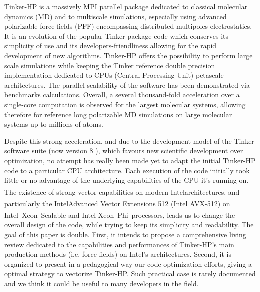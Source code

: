 \documentclass[9pt,comparison]{livecoms}
\newcommand{\rr}{\textsuperscript{\textregistered}}
\newcommand{\tm}{\textsuperscript{\texttrademark}}
\begin{document}
\hspace{\parindent}Tinker-HP is a massively MPI parallel package dedicated to classical molecular dynamics (MD) and to multiscale simulations, especially using advanced polarizable force fields (PFF) encompassing distributed multipoles electrostatics\cite{Tinker-HP}.
It is an evolution of the popular Tinker package code \cite{Tinker8} which conserves its simplicity of use and its developers-friendliness allowing for the rapid development of new algorithms. Tinker-HP offers the possibility to perform large scale simulations while keeping the Tinker reference double precision implementation dedicated to CPUs (Central Processing Unit) petascale architectures. 
The parallel scalability of the software has been demonstrated via benchmarks calculations. Overall, a several thousand-fold acceleration over a single-core computation is observed for the largest molecular systems, allowing therefore for reference long polarizable MD simulations on large molecular systems up to millions of atoms. 

Despite this strong acceleration, and due to the development model of the Tinker software suite (now version 8 \cite{Tinker8}), which favours new scientific development over optimization, no attempt has really been made yet to adapt the initial Tinker-HP code to a particular CPU architecture. Each execution of the code initially took little or no advantage of the underlying capabilities of the CPU it's running on. The existence of strong vector capabilities on modern Intel\rr  architectures, and particularly the Intel\rr Advanced Vector Extensions 512 (Intel AVX-512) on Intel\rr\ Xeon\rr\ Scalable and Intel Xeon\rr\ Phi\tm\ processors, leads us to change the overall design of the code, while trying to keep its simplicity and readability. The goal of this paper is double. First, it intends to propose a comprehensive living review dedicated to the capabilities and performances of Tinker-HP's main production methods (i.e. force fields) on Intel's architectures. Second, it is organized to present in a pedagogical way our code optimization efforts, giving a optimal strategy to vectorize Tinker-HP. Such practical case is rarely documented and we think it could be useful to many developers in the field.
\end{document}
